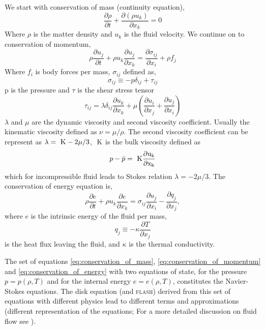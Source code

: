 \documentclass[a4paper,modern]{aastex62}
\def \K{~\rm{K}}
\begin{document}
We start with conservation of mass (continuity equation),
\begin{equation}\label{eq:conservation_of_mass}
\frac{\partial \rho}{\partial t} + \frac{\partial (\rho u_k)}{\partial x_k} = 0
\end{equation}
Where $\rho$ is the matter density and $u_k$ is the fluid velocity.
We continue on to conservation of momentum,
\begin{equation}\label{eq:conservation_of_momentum}
\rho\frac{\partial u_j}{\partial t} + \rho u_k \frac{\partial u_j}{\partial x_k}=\frac{\partial \sigma_{ij}}{\partial x_i}+\rho f_j
\end{equation}
Where $f_i$ is body forces per mass, $\sigma_{ij}$ defined as, 
\begin{equation}
\sigma_{ij} \equiv -p\delta_{ij}+\tau_{ij}
\end{equation}
p is the pressure and $\tau$ is the shear stress tensor
\begin{equation}
     \tau_{ij} = \lambda \delta_{ij} \frac{\partial u_k}{\partial x_k}+ \mu \left( \frac{\partial u_i}{\partial x_j} + \frac{\partial u_j}{\partial x_i} \right)
\end{equation}
$\lambda$ and $\mu$ are the dynamic viscosity and second viscosity coefficient. Usually the kinematic viscosity defined as $\nu = \mu/\rho$. The second viscosity coefficient can be represent as $\lambda = \K - 2\mu/3$, $\K$ is the bulk viscosity defined as
\begin{equation}
    p-\bar p = \K \frac{\partial u_k}{\partial x_k} 
\end{equation}
which for incompressible fluid leads to Stokes relation $\lambda = - 2\mu/3$.
The conservation of energy equation is,
\begin{equation} \label{eq:conservation_of_energy}
\rho\frac{\partial e}{\partial t}+\rho u_k \frac{\partial e}{\partial x_k} = \sigma_{ij} \frac{\partial u_j}{\partial x_i} - \frac{\partial q_j}{\partial x_j}, 
\end{equation}
where $e$ is the intrinsic energy of the fluid per mass, 
\begin{equation}
q_j \equiv -\kappa \frac {\partial T}{\partial x_j}    
\end{equation}
is the heat flux leaving the fluid, and $\kappa$ is the thermal conductivity.

The set of equations \ref{eq:conservation_of_mass}, \ref{eq:conservation_of_momentum} and \ref{eq:conservation_of_energy} with two equations of state, for the pressure $p=p(\rho,T)$ and for the internal energy $e=e(\rho,T)$, constitutes the Navier-Stokes equations. 
The disk equation (and \textsc{flash}) derived from this set of equations with different physics lead to different terms and approximations (different representation of the equations; 
For a more detailed discussion on fluid flow see \citealt{currie2002fundamental}).
\end{document}
